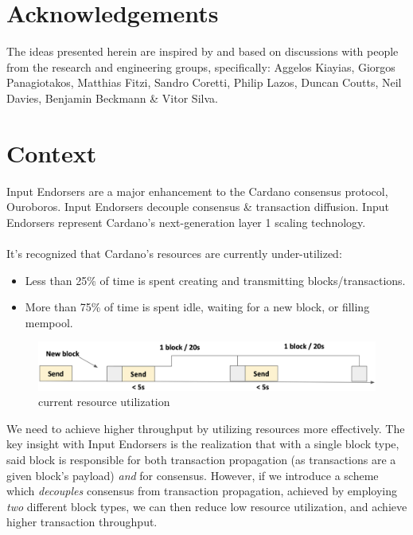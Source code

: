 \documentclass[11pt,a4paper]{article}
\begin{document}
\tableofcontents

\pagebreak

\section{Acknowledgements}
The ideas presented herein are inspired by and based on discussions with
people from the research and engineering groups, specifically: Aggelos Kiayias, 
Giorgos Panagiotakos, Matthias Fitzi, Sandro Coretti, Philip Lazos, Duncan Coutts,
Neil Davies, Benjamin Beckmann \& Vitor Silva.

\pagebreak

\section{Context}
Input Endorsers are a major enhancement to the Cardano consensus protocol, Ouroboros.
Input Endorsers decouple consensus \& transaction diffusion. Input Endorsers represent 
Cardano's next-generation layer 1 scaling technology. \\ \\
It's recognized that Cardano's resources are currently under-utilized:

\begin{itemize}
  \item Less than 25\% of time is spent creating and transmitting blocks/transactions.
  \item More than 75\% of time is spent idle, waiting for a new block, or filling mempool.
\end{itemize}

\begin{figure}[ht]
  \includegraphics[width=\linewidth]{current_usage.png}
  \caption{current resource utilization}
  \label{fig:current utilization}
\end{figure}

We need to achieve higher throughput by utilizing resources more effectively.
The key insight with Input Endorsers is the realization that with a single block
type, said block is responsible for both transaction propagation (as transactions are a 
given block's payload) \emph{and} for consensus. However, if we introduce a scheme which 
\emph{decouples} consensus from transaction propagation, achieved by employing \emph{two} 
different block types, we can then reduce low resource utilization, and achieve higher
transaction throughput. \\
\end{document}
